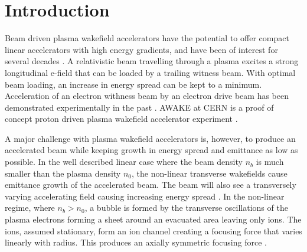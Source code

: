\documentclass[aps,prstab,reprint,amsmath,amssymb,groupedaddress]{revtex4-1}
\begin{document}
\section[\label{S:I}]{Introduction}

Beam driven plasma wakefield accelerators have the potential to offer compact linear accelerators with high energy
gradients, and have been of interest for several decades \cite{chen:1985}. A relativistic beam travelling through a
plasma excites a strong longitudinal e-field that can be loaded by a trailing witness beam. With optimal beam loading,
an increase in energy spread can be kept to a minimum. Acceleration of an electron withness beam by an electron drive
beam has been demonstrated experimentally in the past \cite{rosenzweig:1988, blumenfeld:2007, kallos:2008}. AWAKE at
CERN is a proof of concept proton driven plasma wakefield accelerator experiment \cite{awake_collaboration:2014}.

A major challenge with plasma wakefield accelerators is, however, to produce an accelerated beam while keeping growth in
energy spread and emittance as low as possible. In the well described linear case where the beam density $n_{b}$ is much
smaller than the plasma density $n_{0}$, the non-linear transverse wakefields cause emittance growth of the accelerated
beam. The beam will also see a transversely varying accelerating field causing increasing energy spread
\cite{katsouleas:1987}. In the non-linear regime, where $n_{b} > n_{0}$, a bubble is formed by the transverse
oscillations of the plasma electrons forming a sheet around an evacuated area leaving only ions. The ions, assumed
stationary, form an ion channel creating a focusing force that varies linearly with radius. This produces an axially
symmetric focusing force \cite{lu:2006-1, lu:2006}.

\end{document}
